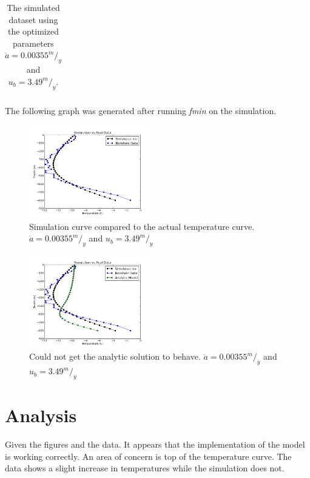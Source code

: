 \documentclass{article}%
\begin{document}
\begin{table}[h!]
\begin{tabular}{c|c}
        \end{tabular}
        \caption{The simulated dataset using the optimized parameters $\dot{a} = 0.00355 ^m/_y$ and $u_b = 3.49 ^m/_y$.}
    \end{table}

    
    The following graph was generated after running {\it fmin} on the simulation. 

    \begin{figure}[h!]
        \centering
        \includegraphics[width=0.48\textwidth]{../img/Simulation_vs_Real.png}
        \caption{Simulation curve compared to the actual temperature curve. $\dot{a} = 0.00355 ^m/_y$ and $u_b = 3.49 ^m/_y$}
    \end{figure}
    
    \begin{figure}[h!]
        \centering
        \includegraphics[width=0.48\textwidth]{../img/bad_analytic.png}
        \caption{Could not get the analytic solution to behave. $\dot{a} = 0.00355 ^m/_y$ and $u_b = 3.49 ^m/_y$}
    \end{figure}

    
    \section{Analysis}
    Given the figures and the data. It appears that the implementation of the model is working correctly. An area of concern is top of the temperature curve. The data shows a slight increase in temperatures while the simulation does not. 
\end{document}
